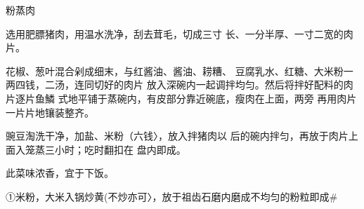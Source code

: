 \begin{recipe}{粉蒸肉}

\ingredients


\cooking

\step 	选用肥膘猪肉，用温水洗净，刮去茸毛，切成三寸 长、一分半厚、一寸二宽的肉片。

\step 	花椒、葱叶混合剁成细末，与红酱油、酱油、耢糟、 豆腐乳水、红糖、大米粉一两四钱，二汤，连同切好的肉片 放入深碗内一起调拌均匀。然后将拌好配料的肉片逐片鱼鱗 式地平铺于蒸碗内，有皮部分靠近碗底，瘦肉在上面，两旁 再用肉片一片片地镶装整齐。

\step 	豌豆淘洗干净，加盐、米粉（六钱〉，放入拌猪肉以 后的碗内拌匀，再放于肉片上面入笼蒸三小时；吃时翻扣在 盘内即成。

\notes

此菜味浓香，宜于下饭。

①米粉，大米入锅炒黄(不炒亦可〉，放于祖齿石磨内磨成不均匀的粉粒即成#

\end{recipe}

